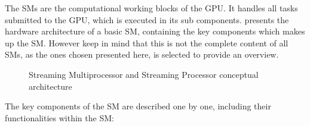 The SMs are the computational working blocks of the GPU.
It handles all tasks submitted to the GPU, which is executed in its sub components.
 presents the hardware architecture of a basic SM, containing the key components which makes up the SM.
However keep in mind that this is not the complete content of all SMs, as the ones chosen presented here, is selected to provide an overview.

\begin{figure}[H]
	\centering
	\caption{Streaming Multiprocessor and Streaming Processor conceptual architecture}
	\label{fig:hw-sm}
\end{figure}

The key components of the SM are described one by one, including their functionalities within the SM:

